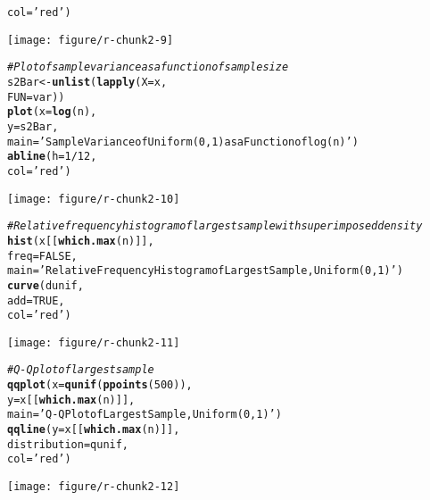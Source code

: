 \documentclass{article}\usepackage[]{graphicx}\usepackage[]{color}
\makeatletter
\def\maxwidth{ %
  \ifdim\Gin@nat@width>\linewidth
    \linewidth
  \else
    \Gin@nat@width
  \fi
}
\newcommand{\hlnum}[1]{\textcolor[rgb]{0.686,0.059,0.569}{#1}}%
\newcommand{\hlstr}[1]{\textcolor[rgb]{0.192,0.494,0.8}{#1}}%
\newcommand{\hlcom}[1]{\textcolor[rgb]{0.678,0.584,0.686}{\textit{#1}}}%
\newcommand{\hlopt}[1]{\textcolor[rgb]{0,0,0}{#1}}%
\newcommand{\hlstd}[1]{\textcolor[rgb]{0.345,0.345,0.345}{#1}}%
\newcommand{\hlkwb}[1]{\textcolor[rgb]{0.69,0.353,0.396}{#1}}%
\newcommand{\hlkwc}[1]{\textcolor[rgb]{0.333,0.667,0.333}{#1}}%
\newcommand{\hlkwd}[1]{\textcolor[rgb]{0.737,0.353,0.396}{\textbf{#1}}}%
\newenvironment{kframe}{%
 \def\at@end@of@kframe{}%
 \ifinner\ifhmode%
  \def\at@end@of@kframe{\end{minipage}}%
  \begin{minipage}{\columnwidth}%
 \fi\fi%
 \def\FrameCommand##1{\hskip\@totalleftmargin \hskip-\fboxsep
 \colorbox{shadecolor}{##1}\hskip-\fboxsep
     \hskip-\linewidth \hskip-\@totalleftmargin \hskip\columnwidth}%
 \MakeFramed {\advance\hsize-\width
   \@totalleftmargin\z@ \linewidth\hsize
   \@setminipage}}%
 {\par\unskip\endMakeFramed%
 \at@end@of@kframe}
\newenvironment{knitrout}{}{} %
\makeatother
\begin{document}
\begin{knitrout}
\begin{kframe}
\begin{alltt}
         \hlkwc{col} \hlstd{=} \hlstr{'red'}\hlstd{)}
\end{alltt}
\end{kframe}
\texttt{[image: figure/r-chunk2-9]} 
\begin{kframe}\begin{alltt}
  \hlcom{# Plot of sample variance as a function of sample size}
  \hlstd{s2Bar} \hlkwb{<-} \hlkwd{unlist}\hlstd{(}\hlkwd{lapply}\hlstd{(}\hlkwc{X} \hlstd{= x,}
                         \hlkwc{FUN} \hlstd{= var))}
  \hlkwd{plot}\hlstd{(}\hlkwc{x} \hlstd{=} \hlkwd{log}\hlstd{(n),}
       \hlkwc{y} \hlstd{= s2Bar,}
       \hlkwc{main} \hlstd{=} \hlstr{'Sample Variance of Uniform (0,1) as a Function of log(n)'}\hlstd{)}
  \hlkwd{abline}\hlstd{(}\hlkwc{h} \hlstd{=} \hlnum{1}\hlopt{/}\hlnum{12}\hlstd{,}
         \hlkwc{col} \hlstd{=} \hlstr{'red'}\hlstd{)}
\end{alltt}
\end{kframe}
\texttt{[image: figure/r-chunk2-10]} 
\begin{kframe}\begin{alltt}
  \hlcom{# Relative frequency histogram of largest sample with superimposed density}
  \hlkwd{hist}\hlstd{(x[[}\hlkwd{which.max}\hlstd{(n)]],}
       \hlkwc{freq} \hlstd{=} \hlnum{FALSE}\hlstd{,}
       \hlkwc{main} \hlstd{=} \hlstr{'Relative Frequency Histogram of Largest Sample, Uniform (0,1)'}\hlstd{)}
  \hlkwd{curve}\hlstd{(dunif,}
        \hlkwc{add} \hlstd{=} \hlnum{TRUE}\hlstd{,}
        \hlkwc{col} \hlstd{=} \hlstr{'red'}\hlstd{)}
\end{alltt}
\end{kframe}
\texttt{[image: figure/r-chunk2-11]} 
\begin{kframe}\begin{alltt}
  \hlcom{# Q-Q plot of largest sample}
  \hlkwd{qqplot}\hlstd{(}\hlkwc{x} \hlstd{=} \hlkwd{qunif}\hlstd{(}\hlkwd{ppoints}\hlstd{(}\hlnum{500}\hlstd{)),}
         \hlkwc{y} \hlstd{= x[[}\hlkwd{which.max}\hlstd{(n)]],}
         \hlkwc{main} \hlstd{=} \hlstr{'Q-Q Plot of Largest Sample, Uniform (0,1)'}\hlstd{)}
  \hlkwd{qqline}\hlstd{(}\hlkwc{y} \hlstd{= x[[}\hlkwd{which.max}\hlstd{(n)]],}
         \hlkwc{distribution} \hlstd{= qunif,}
         \hlkwc{col} \hlstd{=} \hlstr{'red'}\hlstd{)}
\end{alltt}
\end{kframe}
\texttt{[image: figure/r-chunk2-12]} 

\end{knitrout}



\end{document}
